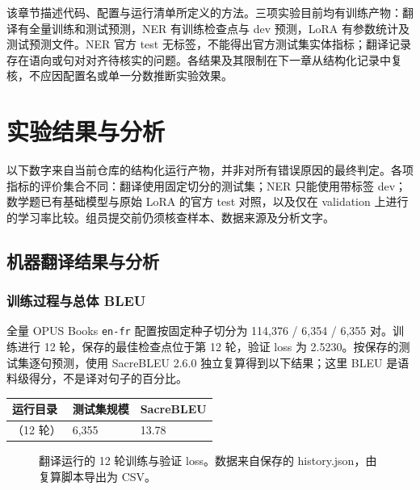 \documentclass[UTF8,a4paper,12pt,fontset=none]{ctexart}
\begin{document}
该章节描述代码、配置与运行清单所定义的方法。三项实验目前均有训练产物：翻译有全量训练和测试预测，NER 有训练检查点与 dev 预测，LoRA 有参数统计及测试预测文件。NER 官方 test 无标签，不能得出官方测试集实体指标；翻译记录存在语向或句对对齐待核实的问题。各结果及其限制在下一章从结构化记录中复核，不应因配置名或单一分数推断实验效果。

\section{实验结果与分析}

以下数字来自当前仓库的结构化运行产物，并非对所有错误原因的最终判定。各项指标的评价集合不同：翻译使用固定切分的测试集；NER 只能使用带标签 dev；数学题已有基础模型与原始 LoRA 的官方 test 对照，以及仅在 validation 上进行的学习率比较。组员提交前仍须核查样本、数据来源及分析文字。

\subsection{机器翻译结果与分析}

\subsubsection{训练过程与总体 BLEU}
全量 OPUS Books \texttt{en-fr} 配置按固定种子切分为 114,376 / 6,354 / 6,355 对。训练进行 12 轮，保存的最佳检查点位于第 12 轮，验证 loss 为 2.5230。按保存的测试集逐句预测，使用 SacreBLEU 2.6.0 独立复算得到以下结果；这里 BLEU 是语料级得分，不是译对句子的百分比。

\noindent\begin{tabularx}{\textwidth}{>{\raggedright\arraybackslash}p{}YY}
\toprule
运行目录 & 测试集规模 & SacreBLEU \\
\midrule
{}（12 轮） & 6,355 & 13.78 \\
\bottomrule
\end{tabularx}

\begin{figure}[htbp]
\centering
{}
\caption{翻译运行的 12 轮训练与验证 loss。数据来自保存的 history.json，由复算脚本导出为 CSV。}
\label{fig:mt-loss}
\end{figure}
\end{document}
